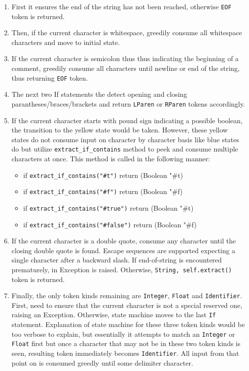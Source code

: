 \begin{itemize}
\begin{enumerate}
\item First it ensures the end of the string has not been reached, otherwise \texttt{EOF} token is returned. 
\item Then, if the current character is whitespace, greedily consume all whitespace characters and move to initial state.
\item If the current character is semicolon thus thus indicating the beginning of a comment, greedily consume all characters until newline or end of the string, thus returning \texttt{EOF} token. 
\item The next two If statements the detect opening and closing parantheses/braces/brackets and return \texttt{LParen} or \texttt{RParen} tokens accordingly.
\item If the current character starts with pound sign indicating a possible boolean, the transition to the yellow state would be taken. However, these yellow states do not consume input on character by character basis like blue states do but utilize \texttt{extract\_if\_contains} method to peek and consume multiple characters at once. This method is called in the following manner:
\begin{itemize}
\item
if \texttt{extract\_if\_contains("\#t")} return (Boolean "\#t)
\item
if \texttt{extract\_if\_contains("\#f")} return (Boolean "\#f)
\item
if \texttt{extract\_if\_contains("\#true")} return (Boolean "\#t)
\item
if \texttt{extract\_if\_contains("\#false")} return (Boolean "\#f)
\end{itemize}

\item If the current character is a double quote, consume any character until the closing double quote is found. Escape sequences are supported expecting a single character after a backward slash. If end-of-string is encountered prematurely, in Exception is raised. Otherwise, \texttt{String, self.extract()} token is returned.

\item Finally, the only token kinds remaining are \texttt{Integer}, \texttt{Float} and \texttt{Identifier}. First, need to ensure that the current character is not a special reserved one, raising an Exception. Otherwise, state machine moves to the last \texttt{If} statement. Explanation of state machine for these three token kinds would be too verbose to explain, but essentially it attempts to match an \texttt{Integer} or \texttt{Float} first but once a character that may not be in these two token kinds is seen, resulting token immediately becomes \texttt{Identifier}. All input from that point on is consumed greedly until some delimiter character.
\end{enumerate}

\end{itemize}

